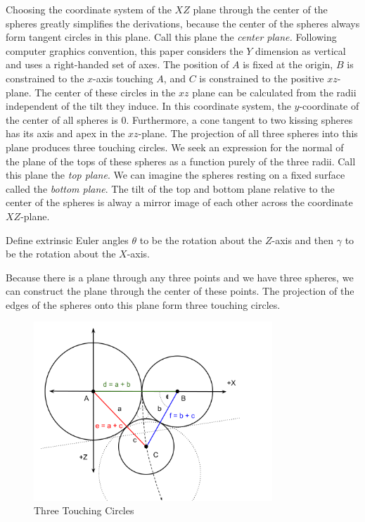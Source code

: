 \documentclass{article}
\begin{document}
Choosing the coordinate system of the $XZ$ plane through the center of the spheres greatly
simplifies the derivations, because the center of the spheres always form tangent circles
in this plane. Call this plane the {\em center plane.}
Following computer graphics convention, this paper considers the $Y$ dimension as vertical and uses a
right-handed set of axes.
The position of $A$ is fixed at the origin, $B$ is constrained to the $x$-axis touching $A$, and
$C$ is constrained to the positive $xz$-plane. The center of these circles in the $xz$ plane can be
calculated from the radii independent of the tilt they induce.
In this coordinate system, the $y$-coordinate of the center of all spheres is $0$.
Furthermore, a cone tangent to two kissing spheres has its axis and apex in the $xz$-plane.
The projection of all three spheres into this plane produces three touching circles.
We seek an expression for the normal of the plane of the tops of these spheres as a function
purely of the three radii. Call this plane the {\em top plane}.
We can imagine the spheres resting on a fixed surface called the {\em bottom plane}.
The tilt of the top and bottom plane relative to the center of the spheres
is alway a mirror image of each other across the coordinate $XZ$-plane.


Define extrinsic Euler angles $\theta$ to be the rotation about the $Z$-axis and then $\gamma$ to
be the rotation about the $X$-axis.

Because there is a plane through any three points and we have three spheres, we can construct the plane through
the center of these points.
The projection of the edges of the spheres onto this plane form three touching circles.

\begin{figure}
     \centering
     \includegraphics[width=0.8\textwidth]{figures/ThreeTouchingPlanarCircles.png}
     \caption{Three Touching Circles}
  \label{fig:Tangent}
\end{figure}
\end{document}
